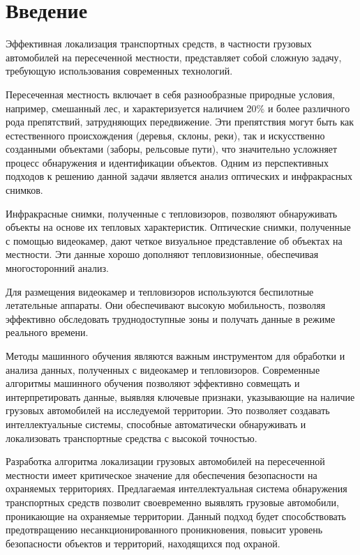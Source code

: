 \chapter*{Введение} %

Эффективная локализация транспортных средств, в частности грузовых автомобилей на пересеченной местности, представляет собой сложную задачу, требующую использования современных технологий. 

Пересеченная местность включает в себя разнообразные природные условия, например, смешанный лес, и характеризуется наличием 20\% и более различного рода препятствий, затрудняющих передвижение. Эти препятствия могут быть как естественного происхождения (деревья, склоны, реки), так и искусственно созданными объектами (заборы, рельсовые пути), что значительно усложняет процесс обнаружения и идентификации объектов. 
Одним из перспективных подходов к решению данной задачи является анализ оптических и инфракрасных снимков. 

Инфракрасные снимки, полученные с тепловизоров, позволяют обнаруживать объекты на основе их тепловых характеристик. Оптические снимки, полученные с помощью видеокамер, дают четкое визуальное представление об объектах на местности. Эти данные хорошо дополняют тепловизионные, обеспечивая многосторонний анализ.

Для размещения видеокамер и тепловизоров используются беспилотные летательные аппараты. Они обеспечивают высокую мобильность, позволяя эффективно обследовать труднодоступные зоны и получать данные в режиме реального времени. 

Методы машинного обучения являются важным инструментом для обработки и анализа данных, полученных с видеокамер и тепловизоров. Современные алгоритмы машинного обучения позволяют эффективно совмещать и интерпретировать данные, выявляя ключевые признаки, указывающие на наличие грузовых автомобилей на исследуемой территории. Это позволяет создавать интеллектуальные системы, способные автоматически обнаруживать и локализовать транспортные средства с высокой точностью.

Разработка алгоритма локализации грузовых автомобилей на пересеченной местности имеет критическое значение для обеспечения безопасности на охраняемых территориях. Предлагаемая интеллектуальная система обнаружения транспортных средств позволит своевременно выявлять грузовые автомобили, проникающие на охраняемые территории. Данный подход будет способствовать предотвращению несанкционированного проникновения, повысит уровень безопасности объектов и территорий, находящихся под охраной.